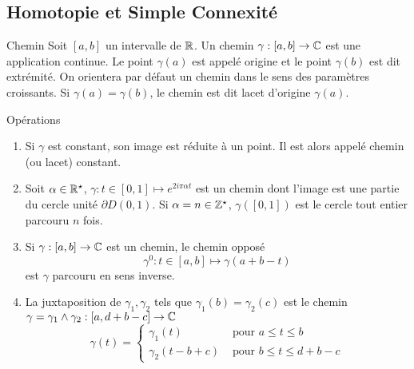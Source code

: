 \documentclass{cours}
\begin{document}
\subsection{Homotopie et Simple Connexité}
\begin{définition}{Chemin}{}
    Soit $\left[a, b\right]$ un intervalle de $\mathbb{R}$. Un chemin $\gamma: \left[a, b\right] \to \mathbb{C}$ est une application continue. Le point $\gamma\left(a\right)$ est appelé origine et le point $\gamma\left(b\right)$ est dit extrémité. On orientera par défaut un chemin dans le sens des paramètres croissants. Si $\gamma\left(a\right) = \gamma\left(b\right)$, le chemin est dit lacet d'origine $\gamma\left(a\right)$.
\end{définition}

\begin{définition}{Opérations}{}
    \begin{enumerate}
        \item Si $\gamma$ est constant, son image est réduite à un point. Il est alors appelé chemin (ou lacet) constant.
        \item Soit $\alpha \in \mathbb{R}^{\star}$, $\gamma : t \in \left[0, 1\right] \mapsto e^{2i\pi \alpha t}$ est un chemin dont l'image est une partie du cercle unité $\partial D\left(0, 1\right)$. Si $\alpha = n \in \mathbb{Z}^{\star}$, $\gamma\left(\left[0, 1\right]\right)$ est le cercle tout entier parcouru $n$ fois. 
        \item Si $\gamma : \left[a, b\right] \to \mathbb{C}$ est un chemin, le chemin opposé 
        \begin{equation*}
            \gamma^{0} : t \in \left[a, b\right] \mapsto \gamma\left(a + b - t\right)
        \end{equation*}
        est $\gamma$ parcouru en sens inverse. 
        \item La juxtaposition de $\gamma_{1}, \gamma_{2}$ tels que $\gamma_{1}\left(b\right) = \gamma_{2}\left(c\right)$ est le chemin $\gamma = \gamma_{1} \land \gamma_{2} : \left[a, d + b - c\right] \to \mathbb{C}$
        \begin{equation*}
            \gamma\left(t\right) = \begin{cases}
                \gamma_{1}\left(t\right) & \text{ pour } a\leq t \leq b\\
            \gamma_{2}\left(t - b + c \right) & \text{ pour } b \leq t \leq d + b - c
            \end{cases}
        \end{equation*}
    \end{enumerate}
\end{définition}
\end{document}
